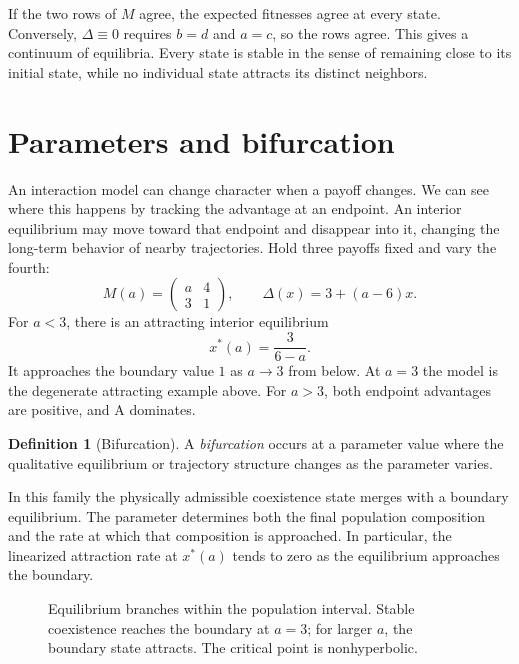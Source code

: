 \documentclass[11pt,oneside,openany]{book}
\theoremstyle{definition}
\newtheorem{definition}[theorem]{Definition}
\theoremstyle{remark}
\numberwithin{equation}{chapter}
\begin{document}
If the two rows of $M$ agree, the expected fitnesses agree at every state. Conversely, $\Delta\equiv0$ requires $b=d$ and $a=c$, so the rows agree. This gives a continuum of equilibria. Every state is stable in the sense of remaining close to its initial state, while no individual state attracts its distinct neighbors.

\section{Parameters and bifurcation}
An interaction model can change character when a payoff changes. We can see where this happens by tracking the advantage at an endpoint. An interior equilibrium may move toward that endpoint and disappear into it, changing the long-term behavior of nearby trajectories.
Hold three payoffs fixed and vary the fourth:
\[
M(a)=\begin{pmatrix}a&4\\3&1\end{pmatrix},\qquad \Delta(x)=3+(a-6)x.
\]
For $a<3$, there is an attracting interior equilibrium
\[
x^*(a)=\frac{3}{6-a}.
\]
It approaches the boundary value $1$ as $a\to3$ from below. At $a=3$ the model is the degenerate attracting example above. For $a>3$, both endpoint advantages are positive, and A dominates.

\begin{definition}[Bifurcation]
A \emph{bifurcation} occurs at a parameter value where the qualitative equilibrium or trajectory structure changes as the parameter varies.
\end{definition}

In this family the physically admissible coexistence state merges with a boundary equilibrium. The parameter determines both the final population composition and the rate at which that composition is approached. In particular, the linearized attraction rate at $x^*(a)$ tends to zero as the equilibrium approaches the boundary.

\begin{figure}[htbp]
\centering
{}
\caption{Equilibrium branches within the population interval. Stable coexistence reaches the boundary at $a=3$; for larger $a$, the boundary state attracts. The critical point is nonhyperbolic.}
\end{figure}
\end{document}
